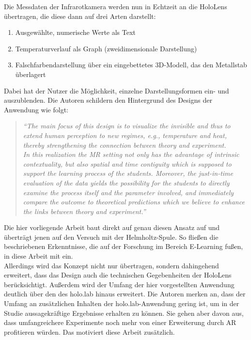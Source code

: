 Die Messdaten der Infrarotkamera werden nun in Echtzeit an die HoloLens übertragen, die diese dann auf drei Arten darstellt:
\begin{enumerate}
	\setlength{\itemsep}{-2pt}
	\item Ausgewählte, numerische Werte als Text
	\item Temperaturverlauf als Graph (zweidimensionale Darstellung)
	\item Falschfarbendarstellung über ein eingebettetes 3D-Modell, das den Metallstab überlagert
\end{enumerate}
Dabei hat der Nutzer die Möglichkeit, einzelne Darstellungsformen ein- und auszublenden. Die Autoren schildern den Hintergrund des Designs der Anwendung wie folgt:
\begin{quote}
	\textit{``The main focus of this design is to visualize the invisible and thus to extend human perception to new regimes, e.g., temperature and heat, thereby strengthening the connection between theory and experiment.\\ 
	In this realization the MR setting not only has the advantage of intrinsic contextuality, but also spatial and time contiguity which is supposed to support the learning process of the students. Moreover, the just-in-time evaluation of the data yields the possibility for the students to directly examine the process itself and the parameter involved, and immediately compare the outcome to theoretical predictions which we believe to enhance the links between theory and experiment.''}
\end{quote}

Die hier vorliegende Arbeit baut direkt auf genau diesen Ansatz auf und überträgt jenen auf den Versuch mit der Helmholtz-Spule. So fließen die beschriebenen Erkenntnisse, die auf der Forschung im Bereich E-Learning fußen, in diese Arbeit mit ein.\\

Allerdings wird das Konzept nicht nur übertragen, sondern dahingehend erweitert, dass das Design auch die technischen Gegebenheiten der HoloLens berücksichtigt. Außerdem wird der Umfang der hier vorgestellten Anwendung deutlich über den des holo.lab hinaus erweitert. Die Autoren merken an, dass der Umfang an zusätzlichen Inhalten der holo.lab-Anwendung gering ist, um in der Studie aussagekräftige Ergebnisse erhalten zu können. Sie gehen aber davon aus, dass umfangreichere Experimente noch mehr von einer Erweiterung durch AR profitieren würden. Das motiviert diese Arbeit zusätzlich.

